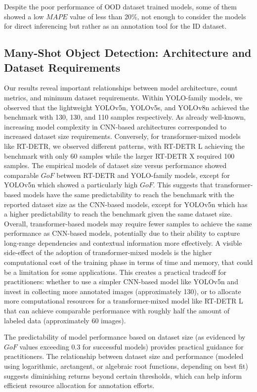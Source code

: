 \documentclass[journal,article,submit,pdftex,moreauthors]{Definitions/mdpi}
\begin{document}
Despite the poor performance of OOD dataset trained models, some of them showed a low $MAPE$ value of less than 20\%,
not enough to consider the models for direct inferencing but rather as an annotation
tool for the ID dataset.

\subsection{Many-Shot Object Detection: Architecture and Dataset Requirements}
Our results reveal important relationships between model architecture, count metrics, 
and minimum dataset requirements. Within YOLO-family models, we observed that the lightweight 
YOLOv5n, YOLOv5s, and YOLOv8n achieved the benchmark with 130, 130, and 110 samples respectively. 
As already well-known, increasing model complexity in CNN-based architectures corresponded to increased 
dataset size requirements.
Conversely, for transformer-mixed models like RT-DETR, we observed different patterns, with RT-DETR L achieving 
the benchmark with only 60 samples while the larger RT-DETR X required 100 samples. The
empirical models of dataset size versus performance showed comparable $GoF$ between RT-DETR and YOLO-family models,
except for YOLOv5n which showed a particularly high $GoF$. This suggests that transformer-based models have
the same predictability to reach the benchmark with the reported dataset size as the CNN-based models, except
for YOLOv5n which has a higher predictability to reach the benchmark given the same dataset size.
Overall, transformer-based models may require fewer samples to achieve the same performance as CNN-based models,
potentially due to their ability to capture long-range dependencies and contextual information more effectively.
A visible side-effect of the adoption of transformer-mixed models is the higher computational cost
of the training phase in terms of time and memory, that could be a limitation for some applications.
This creates a practical tradeoff for practitioners: whether to use a simpler CNN-based model like YOLOv5n 
and invest in collecting more annotated images (approximately 130), or to allocate more computational 
resources for a transformer-mixed model like RT-DETR L that can achieve comparable performance with 
roughly half the amount of labeled data (approximately 60 images).

The predictability of model performance based on dataset size (as evidenced by $GoF$ values exceeding 0.3 
for successful models) provides practical guidance for practitioners. The relationship between dataset 
size and performance (modeled using logarithmic, arctangent, or algebraic root 
functions, depending on best fit) suggests diminishing returns beyond certain thresholds, 
which can help inform efficient resource allocation for annotation efforts.
\end{document}

